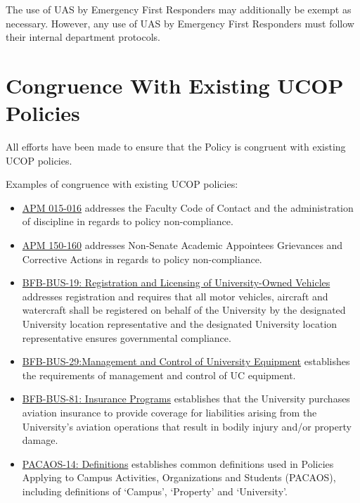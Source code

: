 \documentclass[
]{book}
\providecommand{\tightlist}{%
  \setlength{\itemsep}{0pt}\setlength{\parskip}{0pt}}
\begin{document}
The use of UAS by Emergency First Responders may additionally be exempt as necessary. However, any use of UAS by Emergency First Responders must follow their internal department protocols.

\hypertarget{congruence-with-existing-ucop-policies}{%
\section{Congruence With Existing UCOP Policies}\label{congruence-with-existing-ucop-policies}}

All efforts have been made to ensure that the Policy is congruent with existing UCOP policies.

Examples of congruence with existing UCOP policies:

\begin{itemize}
\tightlist
\item
  \href{https://www.ucop.edu/academic-personnel-programs/academic-personnel-policy/policy-issuances-and-guidelines/revised-apm-015-and-016.html}{APM 015-016} addresses the Faculty Code of Contact and the administration of discipline in regards to policy non-compliance.
\item
  \href{https://www.ucop.edu/academic-personnel-programs/academic-personnel-policy/general-university-policy-regarding-academic-appointees/index.html}{APM 150-160} addresses Non-Senate Academic Appointees Grievances and Corrective Actions in regards to policy non-compliance.
\item
  \href{http://policy.ucop.edu/doc/3220476}{BFB-BUS-19: Registration and Licensing of University-Owned Vehicles} addresses registration and requires that all motor vehicles, aircraft and watercraft shall be registered on behalf of the University by the designated University location representative and the designated University location representative ensures governmental compliance.
\item
  \href{http://policy.ucop.edu/doc/3220477}{BFB-BUS-29:Management and Control of University Equipment} establishes the requirements of management and control of UC equipment.
\item
  \href{http://policy.ucop.edu/doc/3520505}{BFB-BUS-81: Insurance Programs} establishes that the University purchases aviation insurance to provide coverage for liabilities arising from the University's aviation operations that result in bodily injury and/or property damage.
\item
  \href{http://policy.ucop.edu/doc/2710521}{PACAOS-14: Definitions} establishes common definitions used in Policies Applying to Campus Activities, Organizations and Students (PACAOS), including definitions of `Campus', `Property' and `University'.

\end{itemize}
\end{document}
